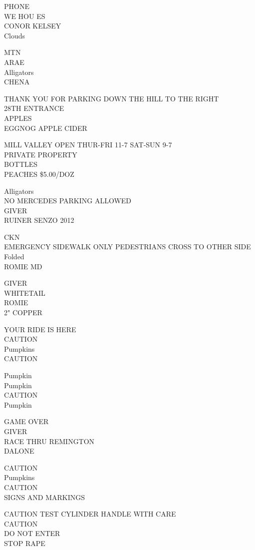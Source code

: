 \documentclass[10pt,letterpaper]{article}
\begin{document}
PHONE\\
WE HOU ES\\
CONOR KELSEY\\
Clouds

MTN\\
ARAE\\
Alligators\\
CHENA

THANK YOU FOR PARKING DOWN THE HILL TO THE RIGHT\\
28TH ENTRANCE\\
APPLES\\
EGGNOG APPLE CIDER

MILL VALLEY OPEN THUR{-}FRI 11{-}7 SAT{-}SUN 9{-}7\\
PRIVATE PROPERTY\\
BOTTLES\\
PEACHES \$5.00/DOZ

Alligators\\
NO MERCEDES PARKING ALLOWED\\
GIVER\\
RUINER SENZO 2012

CKN\\
EMERGENCY SIDEWALK ONLY PEDESTRIANS CROSS TO OTHER SIDE\\
Folded\\
ROMIE MD

GIVER\\
WHITETAIL\\
ROMIE\\
2" COPPER

YOUR RIDE IS HERE\\
CAUTION\\
Pumpkins\\
CAUTION

Pumpkin\\
Pumpkin\\
CAUTION\\
Pumpkin

GAME OVER\\
GIVER\\
RACE THRU REMINGTON\\
DALONE

CAUTION\\
Pumpkins\\
CAUTION\\
SIGNS AND MARKINGS

CAUTION TEST CYLINDER HANDLE WITH CARE\\
CAUTION\\
DO NOT ENTER\\
STOP RAPE
\end{document}
